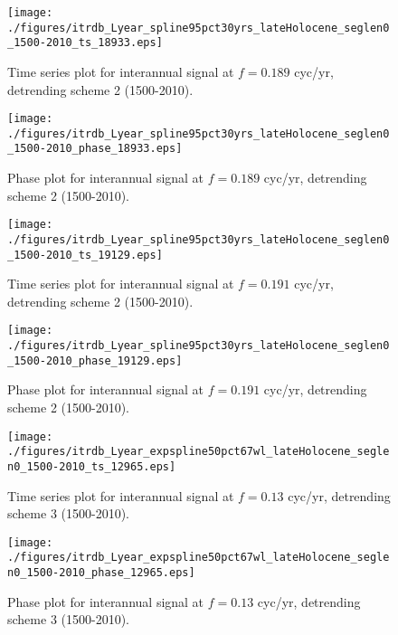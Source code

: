 \documentclass[phd,tocprelim]{cornell}
\begin{document}
\begin{figure}[!tbp]
\centering
\begin{minipage}[b]{0.45\textwidth}
\texttt{[image: ./figures/itrdb\_Lyear\_spline95pct30yrs\_lateHolocene\_seglen0\_1500-2010\_ts\_18933.eps]}
\caption{Time series plot for interannual signal at $f=0.189$ cyc/yr, detrending scheme 2 (1500-2010).}
\label{ts2p3}
\end{minipage}
\hfill
\begin{minipage}[b]{0.45\textwidth}
\texttt{[image: ./figures/itrdb\_Lyear\_spline95pct30yrs\_lateHolocene\_seglen0\_1500-2010\_phase\_18933.eps]}
\caption{Phase plot for interannual signal at $f=0.189$ cyc/yr, detrending scheme 2 (1500-2010).}
\label{map2p3}
\end{minipage}
\end{figure}

\begin{figure}[!tbp]
\centering
\begin{minipage}[b]{0.45\textwidth}
\texttt{[image: ./figures/itrdb\_Lyear\_spline95pct30yrs\_lateHolocene\_seglen0\_1500-2010\_ts\_19129.eps]}
\caption{Time series plot for interannual signal at $f=0.191$ cyc/yr, detrending scheme 2 (1500-2010).}
\label{ts2p4}
\end{minipage}
\hfill
\begin{minipage}[b]{0.45\textwidth}
\texttt{[image: ./figures/itrdb\_Lyear\_spline95pct30yrs\_lateHolocene\_seglen0\_1500-2010\_phase\_19129.eps]}
\caption{Phase plot for interannual signal at $f=0.191$ cyc/yr, detrending scheme 2 (1500-2010).}
\label{map2p4}
\end{minipage}
\end{figure}

\clearpage
\newpage

\begin{figure}[!tbp]
\centering
\begin{minipage}[b]{0.45\textwidth}
\texttt{[image: ./figures/itrdb\_Lyear\_expspline50pct67wl\_lateHolocene\_seglen0\_1500-2010\_ts\_12965.eps]}
\caption{Time series plot for interannual signal at $f=0.13$ cyc/yr, detrending scheme 3 (1500-2010).}
\label{ts3p1}
\end{minipage}
\hfill
\begin{minipage}[b]{0.45\textwidth}
\texttt{[image: ./figures/itrdb\_Lyear\_expspline50pct67wl\_lateHolocene\_seglen0\_1500-2010\_phase\_12965.eps]}
\caption{Phase plot for interannual signal at $f=0.13$ cyc/yr, detrending scheme 3 (1500-2010).}
\label{map3p1}
\end{minipage}
\end{figure}
\end{document}
